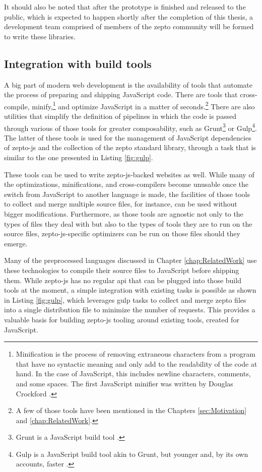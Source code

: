 \documentclass[oneside,11pt,xetex]{scrbook}
\begin{document}
It should also be noted that after the prototype is finished and released to the
public, which is expected to happen shortly after the completion of this thesis,
a development team comprised of members of the zepto community will be formed
to write these libraries.

\subsection{Integration with build tools}
\label{sec:IntegrationTooling}

A big part of modern web development is the availability of tools that automate
the process of preparing and shipping JavaScript code. There are tools that
cross-compile, minify,\footnote{Minification is the process of removing extraneous
characters from a program that have no syntactic meaning and only add to the readability
of the code at hand. In the case of JavaScript, this includes newline characters,
comments, and some spaces. The first JavaScript minifier was written by Douglas
Crockford \parencite{JSMIN}.} and optimize JavaScript in a matter of
seconds.\footnote{A few of those tools have been mentioned in the Chapters
\ref{sec:Motivation} and \ref{chap:RelatedWork}.} There are also utilities that
simplify the definition of pipelines in which the code is passed through various
of those tools for greater composability, such as Grunt\footnote{Grunt is a JavaScript
build tool \parencite{GRUNT}.} or Gulp\footnote{Gulp is a JavaScript build
tool akin to Grunt, but younger and, by its own accounts, faster \parencite{GULP}.}.
The latter of these tools is used for the management of JavaScript dependencies of
zepto-js and the collection of the zepto standard library, through a task that is
similar to the one presented in Listing \ref{fig:gulp}.

These tools can be used to write zepto-js-backed websites as well. While many of
the optimizations, minifications, and cross-compilers become unusable once the switch
from JavaScript to another language is made, the facilities of those tools to collect
and merge multiple source files, for instance, can be used without bigger modifications.
Furthermore, as those tools are agnostic not only to the types of files they deal with
but also to the types of tools they are to run on the source files, zepto-js-specific
optimizers can be run on those files should they emerge.

Many of the preprocessed languages discussed in Chapter \ref{chap:RelatedWork} use these
technologies to compile their source files to JavaScript before shipping them.
While zepto-js has no regular \gls{api} that can be plugged into those build tools
at the moment, a simple integration with existing tasks is possible as shown in
Listing \ref{fig:gulp}, which leverages gulp tasks to collect and merge zepto
files into a single distribution file to minimize the number of requests.
This provides a valuable basis for building zepto-js tooling around existing
tools, created for JavaScript.
\end{document}
